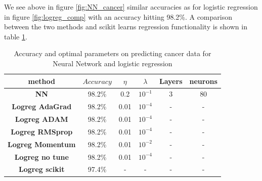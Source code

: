 \documentclass[11pt]{article}
\begin{document}
We see above in figure \ref{fig:NN_cancer} similar accuracies as for logistic regression in figure \ref{fig:logreg_comp} with an accuracy hitting 98.2\%. A comparison between the two methods and scikit learns regression functionality is shown in table \ref{tab:cancer_comp}.
\begin{table}[H]
    \centering
    \caption{Accuracy and optimal parameters on predicting cancer data for Neural Network and logistic regression}
    \label{tab:cancer_comp}
    \begin{tabular}{|c|c|c|c|c|c|}
        \hline
        method                   & $Accuracy$ & $\eta$ & $\lambda$ & Layers & neurons \\
        \hline
        \textbf{NN}              & 98.2\%     & 0.2    & $10^{-1}$ & 3      & 80      \\\hline
        \textbf{Logreg AdaGrad}  & 98.2\%     & 0.01   & $10^{-4}$ & -      & -       \\\hline
        \textbf{Logreg ADAM}     & 98.2\%     & 0.01   & $10^{-4}$ & -      & -       \\\hline
        \textbf{Logreg RMSprop}  & 98.2\%     & 0.01   & $10^{-4}$ & -      & -       \\\hline
        \textbf{Logreg Momentum} & 98.2\%     & 0.01   & $10^{-2}$ & -      & -       \\\hline
        \textbf{Logreg no tune}  & 98.2\%     & 0.01   & $10^{-4}$ & -      & -       \\\hline
        \textbf{Logreg scikit}   & 97.4\%     & -      & -         & -      & -       \\\hline
    \end{tabular}
\end{table}
\end{document}
